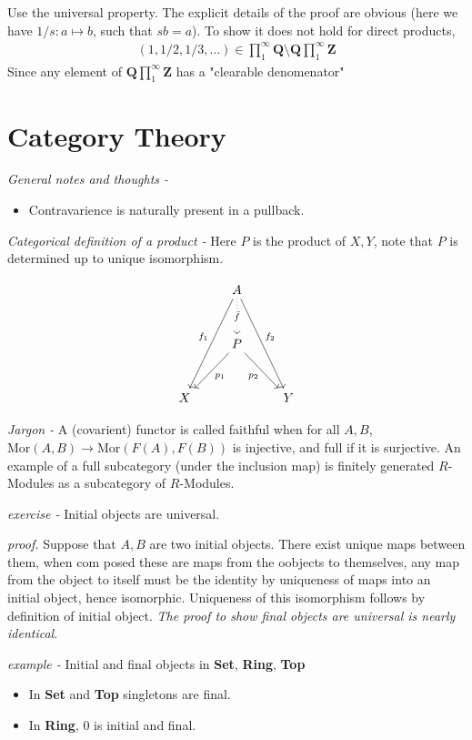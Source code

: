 \documentclass[11pt]{article}
\theoremstyle{definition}
\newcommand{\mor}{\text{Mor}}
\begin{document}
    Use the universal property. The explicit details of the proof are obvious (here we have \(1/s: a \mapsto b\), such that \(sb = a\)). To show it does not hold for direct products,
    \begin{align*}
        (1,1/2,1/3,\hdots) \in \prod_1^\infty \mathbf{Q} \setminus \mathbf{Q}\prod_1^\infty \mathbf{Z}
    \end{align*}
    Since any element of \(\mathbf{Q}\prod_1^\infty \mathbf{Z}\) has a "clearable denomenator"

    \newpage
    \section{Category Theory}

    \emph{General notes and thoughts - }
    \begin{itemize}
        \item Contravarience is naturally present in a pullback.
    \end{itemize}

    \emph{Categorical definition of a product -} Here \(P\) is the product of \(X,Y\), note that \(P\) is determined up to unique isomorphism.

    \begin{equation*}
        \begin{tikzcd}[row sep=1cm]
            &A\arrow[ddl,"f_1"']\arrow[ddr,"f_2"]\arrow[d,dotted,"\bar{f}" description]\\
            &P\arrow[dl,"p_1"]\arrow[dr,"p_2"']\\
            X&&Y
          \end{tikzcd}
    \end{equation*}

    \emph{Jargon - } A (covarient) functor is called faithful when for all \(A,B\), \(\mor(A,B) \to \mor(F(A),F(B))\) is injective, and full if it is surjective.
    An example of a full subcategory (under the inclusion map) is finitely generated \(R\)-Modules as a subcategory of \(R\)-Modules.

    \emph{exercise - } Initial objects are universal. 
    
    \emph{proof.} Suppose that \(A, B\) are two initial objects. There exist unique maps between them, when com posed these are maps from the oobjects to themselves, any map from the object to itself must be the identity by uniqueness of maps into an initial object, hence isomorphic. Uniqueness of this isomorphism follows by definition of initial object. \emph{The proof to show final objects are universal is nearly identical}.

    \emph{example - } Initial and final objects in \textbf{Set}, \textbf{Ring}, \textbf{Top}

    \begin{itemize}
        \item In \textbf{Set} and \textbf{Top} singletons are final.
        \item In \textbf{Ring}, \(0\) is initial and final.
    \end{itemize}
\end{document}
